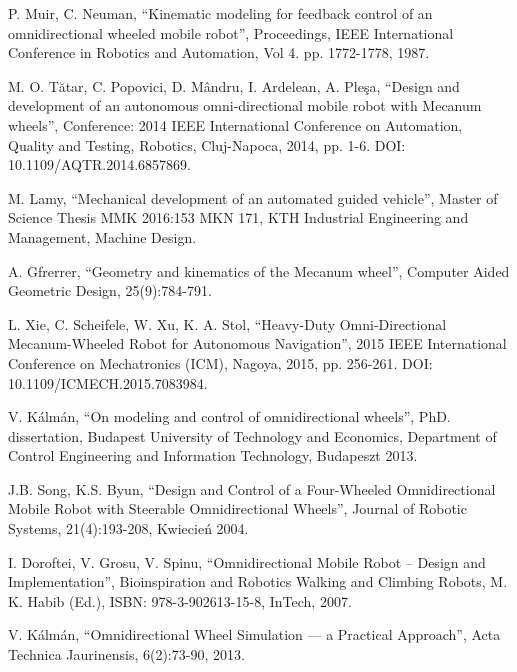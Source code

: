 \begin{thebibliography}{0}

P. Muir, C. Neuman,
``Kinematic modeling for feedback control of an omnidirectional wheeled mobile robot'', 
Proceedings, IEEE International Conference in Robotics and Automation, 
Vol 4. pp. 1772-1778, 1987.

M. O. Tătar, C. Popovici, D. Mândru, I. Ardelean, A. Pleşa,
``Design and development of an autonomous omni-directional mobile robot with Mecanum wheels'',
Conference: 2014 IEEE International Conference on Automation, Quality and Testing, Robotics,
Cluj-Napoca, 2014, pp. 1-6. DOI: 10.1109/AQTR.2014.6857869.

M. Lamy, 
``Mechanical development of an automated guided vehicle'',
Master of Science Thesis MMK 2016:153 MKN 171,
KTH Industrial Engineering and Management,
Machine Design.

A. Gfrerrer, 
``Geometry and kinematics of the Mecanum wheel'',
Computer Aided Geometric Design,
25(9):784-791.

L. Xie, C. Scheifele, W. Xu, K. A. Stol, 
``Heavy-Duty Omni-Directional Mecanum-Wheeled Robot for Autonomous Navigation'',
2015 IEEE International Conference on Mechatronics (ICM), Nagoya, 2015, pp. 256-261.
DOI: 10.1109/ICMECH.2015.7083984.

V. Kálmán, 
``On modeling and control of omnidirectional wheels'',
PhD. dissertation, Budapest University of Technology and Economics,
Department of Control Engineering and Information Technology,
Budapeszt 2013.

J.B. Song, K.S. Byun,
``Design and Control of a Four-Wheeled Omnidirectional Mobile Robot with Steerable Omnidirectional Wheels'',
Journal of Robotic Systems,
21(4):193-208, 
Kwiecień 2004.

I. Doroftei, V. Grosu, V. Spinu,
``Omnidirectional Mobile Robot – Design and Implementation'',
Bioinspiration and Robotics Walking and Climbing Robots, M. K. Habib (Ed.), 
ISBN: 978-3-902613-15-8, InTech,
2007.

V. Kálmán,
``Omnidirectional Wheel Simulation --- a Practical Approach'',
Acta Technica Jaurinensis,
6(2):73-90,
2013.


\end{thebibliography}
